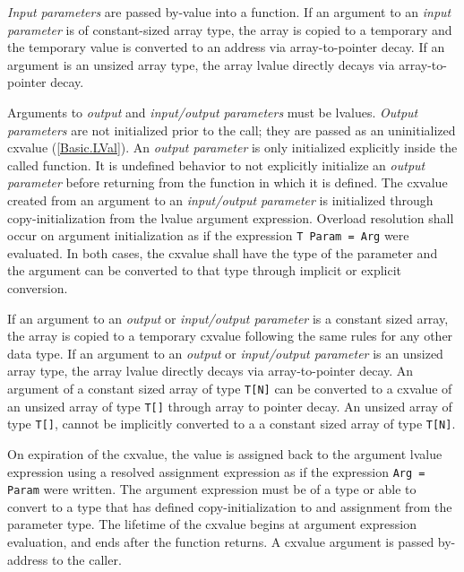 \p \textit{Input parameters} are passed by-value into a function. If an argument
to an \textit{input parameter} is of constant-sized array type, the array is
copied to a temporary and the temporary value is converted to an address via
array-to-pointer decay. If an argument is an unsized array type, the array
lvalue directly decays via array-to-pointer decay.


\p Arguments to \textit{output} and \textit{input/output parameters} must be
lvalues. \textit{Output parameters} are not initialized prior to the call; they
are passed as an uninitialized cxvalue (\ref{Basic.LVal}). An \textit{output
parameter} is only initialized explicitly inside the called function. It is
undefined behavior to not explicitly initialize an \textit{output parameter}
before returning from the function in which it is defined. The cxvalue created
from an argument to an \textit{input/output parameter} is initialized through
copy-initialization from the lvalue argument expression. Overload resolution
shall occur on argument initialization as if the expression \texttt{T Param =
Arg} were evaluated. In both cases, the cxvalue shall have the type of the
parameter and the argument can be converted to that type through implicit or
explicit conversion.

\p If an argument to an \textit{output} or \textit{input/output parameter} is a
constant sized array, the array is copied to a temporary cxvalue following the
same rules for any other data type. If an argument to an \textit{output} or
\textit{input/output parameter} is an unsized array type, the array lvalue
directly decays via array-to-pointer decay. An argument of a constant sized
array of type \texttt{T[N]} can be converted to a cxvalue of an unsized array
of type \texttt{T[]} through array to pointer decay. An unsized array of type
\texttt{T[]}, cannot be implicitly converted to a a constant sized array of type
\texttt{T[N]}.


\p On expiration of the cxvalue, the value is assigned back to the argument
lvalue expression using a resolved assignment expression as if the expression
\texttt{Arg = Param} were written. The argument expression must be of a type or
able to convert to a type that has defined copy-initialization to and assignment
from the parameter type. The lifetime of the cxvalue begins at argument
expression evaluation, and ends after the function returns. A cxvalue argument
is passed by-address to the caller.


